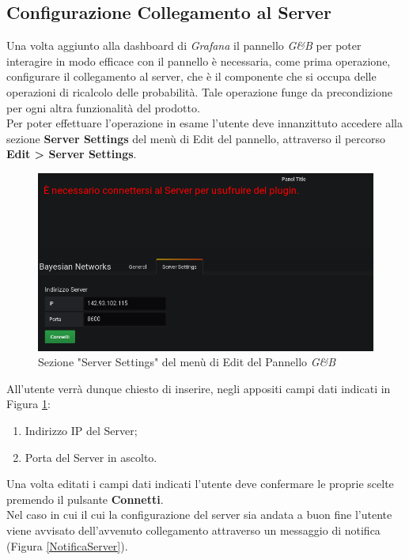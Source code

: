 \subsection{Configurazione Collegamento al Server}\label{CCS}

Una volta aggiunto alla dashboard di \textit{Grafana} il pannello \textit{G\&B} per poter interagire in modo efficace con il pannello è necessaria, come prima operazione, configurare il collegamento al server, che è il componente che si occupa delle operazioni di ricalcolo delle probabilità. Tale operazione funge da precondizione per ogni altra funzionalità del prodotto.\\
Per poter effettuare l'operazione in esame l'utente deve innanzittuto accedere alla sezione \textbf{Server Settings} del menù di Edit del pannello, attraverso il percorso \textbf{Edit > Server Settings}.

\begin{figure}[H]
	\begin{center}
		\includegraphics[scale=0.5]{./images/ServerSettings.png}
		 \caption{Sezione "Server Settings" del menù di Edit del Pannello \textit{G\&B}}	
		 \label{ServerSettings}
	\end{center}
\end{figure}

All'utente verrà dunque chiesto di inserire, negli appositi campi dati indicati in Figura \ref{ServerSettings}:
\begin{enumerate}
	\item Indirizzo IP del Server;
	\item Porta del Server in ascolto.
\end{enumerate}
Una volta editati i campi dati indicati l'utente deve confermare le proprie scelte premendo il pulsante \textbf{Connetti}.\\
Nel caso in cui il cui la configurazione del server sia andata a buon fine l'utente viene avvisato dell'avvenuto collegamento attraverso un messaggio di notifica (Figura \ref{NotificaServer}).

